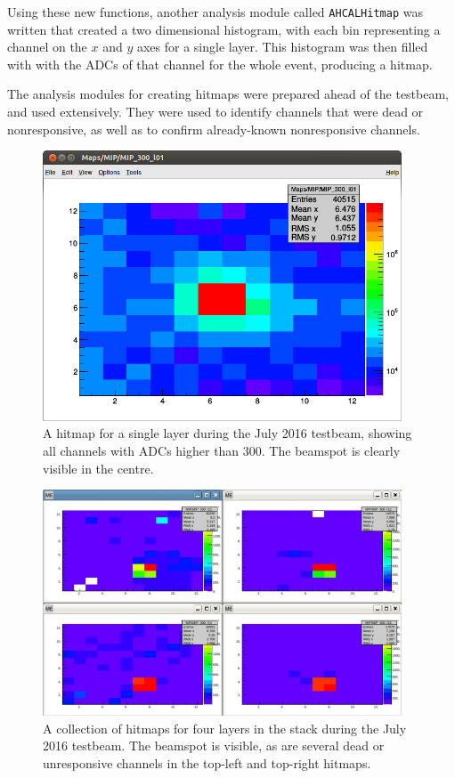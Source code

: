 Using these new functions, another analysis module called \texttt{AHCALHitmap} was written that created a two dimensional histogram, with each bin representing a channel on the $x$ and $y$ axes for a single layer. This histogram was then filled with with the \acrshort{ADC}s of that channel for the whole event, producing a hitmap.

The analysis modules for creating hitmaps were prepared ahead of the testbeam, and used extensively. They were used to identify channels that were dead or nonresponsive, as well as to confirm already-known nonresponsive channels.

\begin{figure}[p]
	\centering
	\includegraphics[width=0.95\textwidth]{../Pictures/AHCALHitmapSingle.png}
	\caption{A hitmap for a single layer during the July 2016 testbeam, showing all channels with \acrshort{ADC}s higher than 300. The beamspot is clearly visible in the centre.}
	\label{figure:aida/july2016/single-hitmap}
\end{figure}

\begin{figure}[p]
	\centering
	\includegraphics[width=0.95\textwidth]{../Pictures/AHCALHitmapFour.png}
	\caption{A collection of hitmaps for four layers in the stack during the July 2016 testbeam. The beamspot is visible, as are several dead or unresponsive channels in the top-left and top-right hitmaps.}
	\label{figure:aida/july2016/four-hitmap}
\end{figure}


